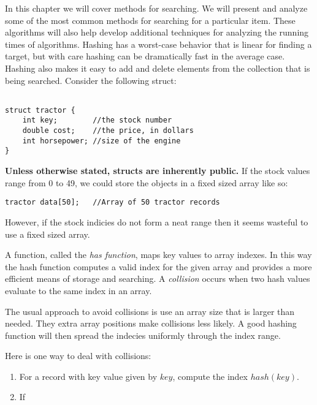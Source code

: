 In this chapter we will cover methods for searching. We will present and analyze some of the most common methods for searching for a particular item. These algorithms will also help develop additional techniques for analyzing the running times of algorithms.
Hashing has a worst-case behavior that is linear for finding a target, but with care hashing can be dramatically fast in the average case. Hashing also makes it easy to add and delete elements from the collection that is being searched.
Consider the following struct:
\begin{lstlisting}[basicstyle=\ttfamily]

struct tractor {
    int key;        //the stock number
    double cost;    //the price, in dollars
    int horsepower; //size of the engine
}
\end{lstlisting}
\textbf{Unless otherwise stated, structs are inherently public.} If the stock values range from 0 to 49, we could store the objects in a fixed sized array like so:
\begin{lstlisting}[basicstyle=\ttfamily]
tractor data[50];   //Array of 50 tractor records
\end{lstlisting}
However, if the stock indicies do not form a neat range then it seems wasteful to use a fixed sized array.

A function, called the \emph{has function}, maps key values to array indexes. In this way the hash function computes a valid index for the given array and provides a more efficient means of storage and searching. A \emph{collision} occurs when two hash values evaluate to the same index in an array.

The usual approach to avoid collisions is use an array size that is larger than needed. They extra array positions make collisions less likely. A good hashing function will then spread the indecies uniformly  through the index range.

Here is one way to deal with collisions:
\begin{example}
\begin{enumerate}
\item For a record with key value given by $key$, compute the index $hash(key)$.
\item If 
\end{enumerate}
\end{example}

